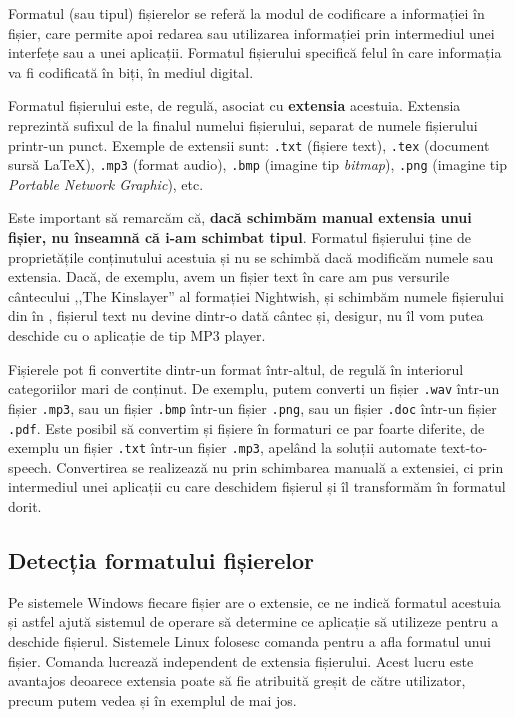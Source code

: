 Formatul (sau tipul) fișierelor se referă la modul de
codificare a informației în fișier, care permite apoi redarea sau utilizarea
informației prin intermediul unei interfețe sau a unei aplicații. Formatul
fișierului specifică felul în care informația va fi codificată în biți, în
mediul digital.

Formatul fișierului este, de regulă, asociat cu \textbf{extensia} acestuia.
Extensia reprezintă sufixul de la finalul numelui fișierului, separat de numele
fișierului printr-un punct. Exemple de extensii sunt: \texttt{.txt}
(fișiere text), \texttt{.tex} (document sursă LaTeX), \texttt{.mp3} (format audio), \texttt{.bmp} (imagine tip
\textit{bitmap}), \texttt{.png} (imagine tip \textit{Portable Network Graphic}), etc.

Este important să remarcăm că, \textbf{dacă schimbăm manual extensia unui
fișier, nu înseamnă că i-am schimbat tipul}. Formatul fișierului ține de
proprietățile conținutului acestuia și nu se schimbă dacă modificăm numele sau
extensia. Dacă, de exemplu, avem un fișier text în care am pus versurile
cântecului ,,The Kinslayer'' al formației Nightwish, și schimbăm numele
fișierului din  în , fișierul text nu devine
dintr-o dată cântec și, desigur, nu îl vom putea deschide cu o aplicație de tip MP3
player.

Fișierele pot fi convertite dintr-un format într-altul, de regulă în interiorul
categoriilor mari de conținut. De exemplu, putem converti un fișier \texttt{.wav} într-un fișier \texttt {.mp3},
sau un fișier \texttt{.bmp} într-un fișier \texttt{.png}, sau un fișier \texttt{.doc} într-un fișier \texttt{.pdf}. Este posibil să convertim și
fișiere în formaturi ce par foarte diferite, de exemplu un fișier \texttt{.txt} într-un fișier \texttt{.mp3},
apelând la soluții automate text-to-speech. Convertirea se realizează
nu prin schimbarea manuală a extensiei, ci prin intermediul unei aplicații cu
care deschidem fișierul și îl transformăm în formatul dorit.

\subsection{Detecția formatului fișierelor}
\label{sec:file-system-format-detection}

Pe sistemele Windows fiecare fișier are o extensie, ce ne indică formatul
acestuia și astfel ajută sistemul de operare să determine ce aplicație să
utilizeze pentru a deschide fișierul. Sistemele Linux folosesc comanda 
pentru a afla formatul unui fișier. Comanda  lucrează independent de extensia
fișierului. Acest lucru este avantajos deoarece extensia poate să fie atribuită
greșit de către utilizator, precum putem vedea și în exemplul de mai jos.

